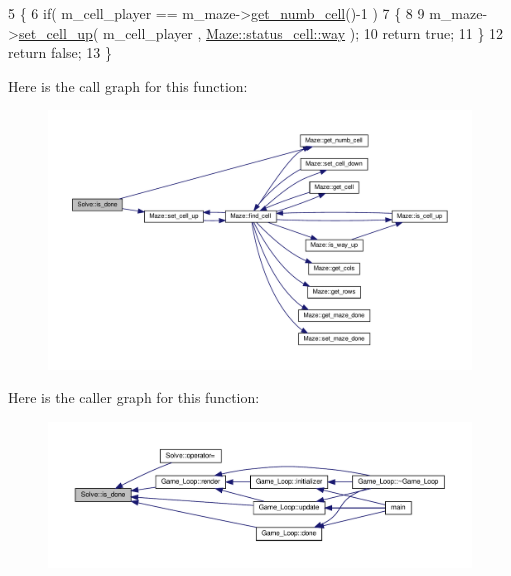 \begin{DoxyCode}
5 \{
6     \textcolor{keywordflow}{if}( m\_cell\_player == m\_maze->\hyperlink{classMaze_a90f5c1c140a9991942204d4a7fec3bf8}{get\_numb\_cell}()-1 )
7     \{
8 
9         m\_maze->\hyperlink{classMaze_aa7c832a91a3db8f48b31f688332f8986}{set\_cell\_up}( m\_cell\_player , \hyperlink{classMaze_a07167e321eac2b67100fb82ecb98f1d1ac83b72dd001482ce10f0b106c7a0ed0e}{Maze::status\_cell::way} );
10         \textcolor{keywordflow}{return} \textcolor{keyword}{true};
11     \}
12     \textcolor{keywordflow}{return} \textcolor{keyword}{false};
13 \}
\end{DoxyCode}
Here is the call graph for this function\+:\nopagebreak
\begin{figure}[H]
\begin{center}
\leavevmode
\includegraphics[width=350pt]{classSolve_a868db181d288fdb10e5592b62e669c3b_cgraph}
\end{center}
\end{figure}
Here is the caller graph for this function\+:\nopagebreak
\begin{figure}[H]
\begin{center}
\leavevmode
\includegraphics[width=350pt]{classSolve_a868db181d288fdb10e5592b62e669c3b_icgraph}
\end{center}
\end{figure}
\mbox{\label{classSolve_a8902b46862c7759928495e3684054f82}} 
